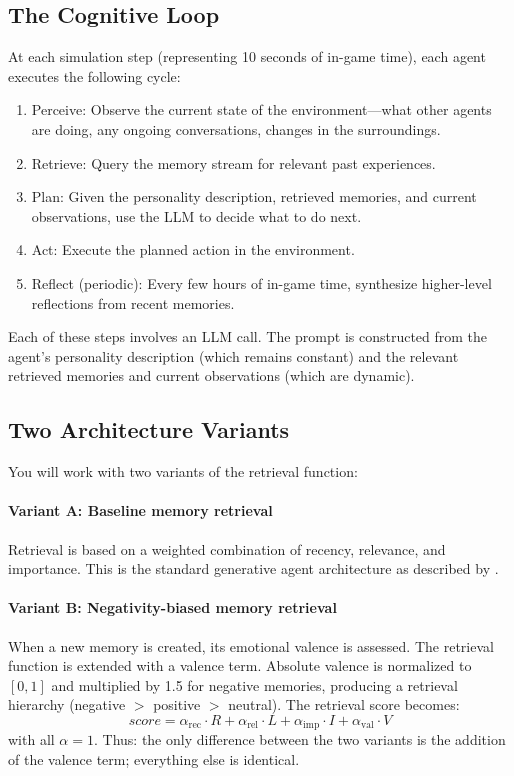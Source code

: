 \subsection{The Cognitive Loop}

At each simulation step (representing 10 seconds of in-game time), each agent executes the following cycle:
\begin{enumerate}
    \item Perceive: Observe the current state of the environment---what other agents are doing, any ongoing conversations, changes in the surroundings.
    \item Retrieve: Query the memory stream for relevant past experiences.
    \item Plan: Given the personality description, retrieved memories, and current observations, use the LLM to decide what to do next.
    \item Act: Execute the planned action in the environment.
    \item Reflect (periodic): Every few hours of in-game time, synthesize higher-level reflections from recent memories.
\end{enumerate}

Each of these steps involves an LLM call. The prompt is constructed from the agent's personality description (which remains constant) and the relevant retrieved memories and current observations (which are dynamic).

\subsection{Two Architecture Variants}

You will work with two variants of the retrieval function:

\paragraph{Variant A: Baseline memory retrieval}
Retrieval is based on a weighted combination of recency, relevance, and importance. This is the standard generative agent architecture as described by \citet{park2023generative}.

\paragraph{Variant B: Negativity-biased memory retrieval}
When a new memory is created, its emotional valence is assessed. The retrieval function is extended with a valence term. Absolute valence is normalized to $[0, 1]$ and multiplied by 1.5 for negative memories, producing a retrieval hierarchy (negative $>$ positive $>$ neutral). The retrieval score becomes:
\begin{equation}\label{eq:retrieval-never}
    \textit{score} = \alpha_{\text{rec}} \cdot R + \alpha_{\text{rel}} \cdot L + \alpha_{\text{imp}} \cdot I + \alpha_{\text{val}} \cdot V
\end{equation}
with all $\alpha = 1$. Thus: the only difference between the two variants is the addition of the valence term; everything else is identical.

